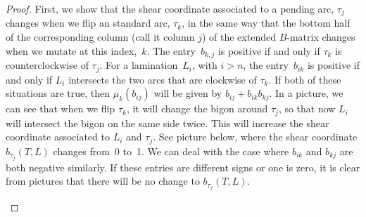 \documentclass[11pt]{article}
\numberwithin{equation}{section}
\begin{document}
\begin{proof}First, we show that the shear coordinate associated to a pending arc, $\tau_j$ changes when we flip an standard arc, $\tau_k$, in the same way that the bottom half of the corresponding column (call it column $j$) of the extended
$B$-matrix changes when we mutate at this index,~$k$. The entry~$b_{k,j}$ is positive if and only if $\tau_k$ is counterclockwise of $\tau_j$. For a lamination~$L_i$, with $i > n$, the entry~$b_{ik}$ is positive if and only if $L_i$ intersects the two arcs that are clockwise of $\tau_k$. If both of these situations are true, then $\mu_k(b_{ij})$ will be given by $b_{ij} + b_{ik}b_{kj}$. In a picture, we can see that when we flip $\tau_k$, it will change the bigon around $\tau_j$, so that now $L_i$ will intersect the bigon on the same side twice. This will increase the shear coordinate associated to $L_i$ and $\tau_j$. See picture below, where the shear coordinate $b_{\tau_j}(T, L)$ changes from~0 to~1. We can deal with the case where $b_{ik}$ and $b_{kj}$ are both negative similarly. If these entries are different signs or one is zero, it is clear from pictures that there will be no change to $b_{\tau_j}(T,L)$.

\begin{center}
\end{center}
\end{proof}
\end{document}
